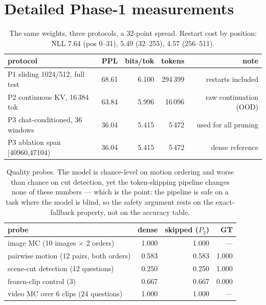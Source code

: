 \documentclass[11pt]{article}
\begin{document}
\section{Detailed Phase-1 measurements}
\begin{table}[H]\centering\small
\begin{tabular}{lrrrr}
\toprule
protocol & PPL & bits/tok & tokens & note \\
\midrule
P1 sliding 1024/512, full test & 68.61 & 6.100 & 294\,399 & restarts included \\
P2 continuous KV, 16\,384 tok & 63.84 & 5.996 & 16\,096 & raw continuation (OOD) \\
P3 chat-conditioned, 36 windows & 36.04 & 5.415 & 5\,472 & used for all pruning \\
P3 ablation span [40960,47104) & 36.04 & 5.415 & 5\,472 & dense reference \\
\bottomrule
\end{tabular}
\caption{The same weights, three protocols, a 32-point spread. Restart cost by position:
NLL 7.64 (pos 0--31), 5.49 (32--255), 4.57 (256--511).}
\end{table}

\begin{table}[H]\centering\small
\begin{tabular}{lrrr}
\toprule
probe & dense & skipped ($P_2$) & GT \\
\midrule
image MC (10 images $\times$ 2 orders) & 1.000 & 1.000 & --- \\
pairwise motion (12 pairs, both orders) & 0.583 & 0.583 & 1.000 \\
scene-cut detection (12 questions) & 0.250 & 0.250 & 1.000 \\
frozen-clip control (3) & 0.667 & 0.667 & 0.000 \\
video MC over 6 clips (24 questions) & 1.000 & 1.000 & --- \\
\bottomrule
\end{tabular}
\caption{Quality probes. The model is chance-level on motion ordering and worse than chance
on cut detection, yet the token-skipping pipeline changes none of these numbers --- which
is the point: the pipeline is safe on a task where the model is blind, so the safety
argument rests on the exact-fallback property, not on the accuracy table.}
\end{table}
\end{document}
